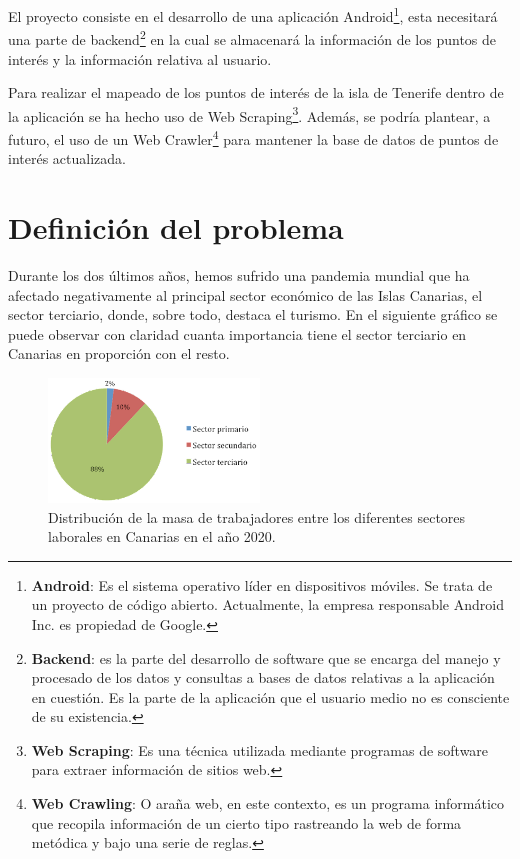 
El proyecto consiste en el desarrollo de una aplicación Android\footnote{\textbf{Android}: Es el sistema operativo líder en dispositivos móviles. Se trata de un proyecto de código abierto. Actualmente, la empresa responsable Android Inc. es propiedad de Google.}, esta necesitará una parte de backend\footnote{\textbf{Backend}: es la parte del desarrollo de software que se encarga del manejo y procesado de los datos y consultas a bases de datos relativas a la aplicación en cuestión. Es la parte de la aplicación que el usuario medio no es consciente de su existencia.} en la cual se almacenará la información de los puntos de interés y la información relativa al usuario.

Para realizar el mapeado de los puntos de interés de la isla de Tenerife dentro de la aplicación se ha hecho uso de Web Scraping\footnote{\textbf{Web Scraping}: Es una técnica utilizada mediante programas de software para extraer información de sitios web.}. Además, se podría plantear, a futuro, el uso de un Web Crawler\footnote{\textbf{Web Crawling}: O araña web, en este contexto, es un programa informático que recopila información de un cierto tipo rastreando la web de forma metódica y bajo una serie de reglas.} para mantener la base de datos de puntos de interés actualizada.


\section{Definición del problema}

Durante los dos últimos años, hemos sufrido una pandemia mundial que ha afectado negativamente al principal sector económico de las Islas Canarias, el sector terciario, donde, sobre todo, destaca el turismo. En el siguiente gráfico se puede observar con claridad cuanta importancia tiene el sector terciario en Canarias en proporción con el resto.

\begin{figure}[H]
    \centering
    \includegraphics[width=0.5\textwidth]{Memoria_TFG_LaTeX/images/sectoresEconomicosCanarias.png}
    \caption{Distribución de la masa de trabajadores entre los diferentes sectores laborales en Canarias en el año 2020\cite{sectoresEconomicosCanarias}.}
    \label{fig:sectoresCanarias}
\end{figure}

